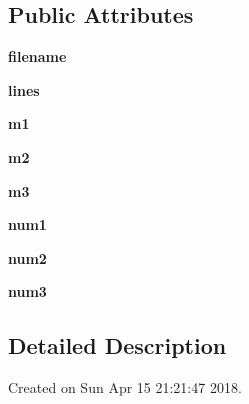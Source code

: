 \subsection*{Public Attributes}
\begin{DoxyCompactItemize}
\item 
{\bfseries filename}\hypertarget{classloadfile_1_1Loadfile_acacbd4d352c53cc6d2fd19322b9baef2}{}\label{classloadfile_1_1Loadfile_acacbd4d352c53cc6d2fd19322b9baef2}

\item 
{\bfseries lines}\hypertarget{classloadfile_1_1Loadfile_ab8940d1ae9f810fbaeeb6e64d8c8e6ef}{}\label{classloadfile_1_1Loadfile_ab8940d1ae9f810fbaeeb6e64d8c8e6ef}

\item 
{\bfseries m1}\hypertarget{classloadfile_1_1Loadfile_ad7d0be45f9490d58114f170226c4e6de}{}\label{classloadfile_1_1Loadfile_ad7d0be45f9490d58114f170226c4e6de}

\item 
{\bfseries m2}\hypertarget{classloadfile_1_1Loadfile_a7f0850d707afd62b93d238f0c41ff501}{}\label{classloadfile_1_1Loadfile_a7f0850d707afd62b93d238f0c41ff501}

\item 
{\bfseries m3}\hypertarget{classloadfile_1_1Loadfile_a72f525fceaf0e4fcf5ca20bbe898adde}{}\label{classloadfile_1_1Loadfile_a72f525fceaf0e4fcf5ca20bbe898adde}

\item 
{\bfseries num1}\hypertarget{classloadfile_1_1Loadfile_afc54c0c5d7bc351e3be0c8c32d4ae750}{}\label{classloadfile_1_1Loadfile_afc54c0c5d7bc351e3be0c8c32d4ae750}

\item 
{\bfseries num2}\hypertarget{classloadfile_1_1Loadfile_a795c518f63da4e836a543534376e2c26}{}\label{classloadfile_1_1Loadfile_a795c518f63da4e836a543534376e2c26}

\item 
{\bfseries num3}\hypertarget{classloadfile_1_1Loadfile_a6c1b150463304c957d13162a68379947}{}\label{classloadfile_1_1Loadfile_a6c1b150463304c957d13162a68379947}

\end{DoxyCompactItemize}


\subsection{Detailed Description}
Created on Sun Apr 15 21\+:21\+:47 2018. 

